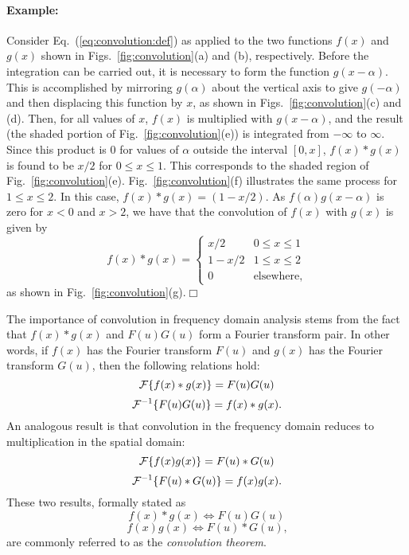 \paragraph{Example:} Consider Eq.~(\ref{eq:convolution:def}) as applied
to the two functions $f(x)$ and $g(x)$ shown in
Figs.~\ref{fig:convolution}(a) and (b), respectively.  Before the
integration can be carried out, it is necessary to form the function
$g(x-\alpha)$.  This is accomplished by mirroring $g(\alpha)$ about
the vertical axis to give $g(-\alpha)$ and then displacing this
function by $x$, as shown in Figs.~\ref{fig:convolution}(c) and (d).
Then, for all values of $x$, $f(x)$ is multiplied with $g(x-\alpha)$,
and the result (the shaded portion of Fig.~\ref{fig:convolution}(e))
is integrated from $-\infty$ to $\infty$.  Since this product is $0$
for values of $\alpha$ outside the interval $[0,x]$, $f(x)\ast g(x)$
is found to be $x/2$ for $0\leq x\leq 1$.  This corresponds to the
shaded region of Fig.~\ref{fig:convolution}(e).
Fig.~\ref{fig:convolution}(f) illustrates the same process for $1\leq
x\leq 2$.  In this case, $f(x)\ast g(x)=(1-x/2)$.  As
$f(\alpha)g(x-\alpha)$ is zero for $x<0$ and $x>2$, we have that the
convolution of $f(x)$ with $g(x)$ is given by
\begin{equation}
  f(x)\ast g(x)=\left\{\begin{array}{ll}
                         x/2   & 0\leq x\leq 1 \\
                         1-x/2 & 1\leq x\leq 2 \\
                         0     & \mbox{elsewhere,}
                       \end{array}\right.
\end{equation}
as shown in Fig.~\ref{fig:convolution}(g).\hfill$\Box$
\vspace*{0.5cm}

The importance of convolution in frequency domain analysis stems from
the fact that $f(x)\ast g(x)$ and $F(u)G(u)$ form a Fourier transform
pair.  In other words, if $f(x)$ has the Fourier transform $F(u)$ and
$g(x)$ has the Fourier transform $G(u)$, then the following relations
hold:
\begin{equation}
  {\cal F}\{f(x)\ast g(x)\}=F(u)G(u)
\end{equation}
\begin{equation}
  {\cal F}^{-1}\{F(u)G(u)\}=f(x)\ast g(x)\mbox{.}
\end{equation}
An analogous result is that convolution in the frequency domain
reduces to multiplication in the spatial domain:
\begin{equation}
  {\cal F}\{f(x)g(x)\}=F(u)\ast G(u)
\end{equation}
\begin{equation}
  {\cal F}^{-1}\{F(u)\ast G(u)\}=f(x)g(x)\mbox{.}
\end{equation}
These two results, formally stated as
\begin{equation}
  f(x)\ast g(x)\Leftrightarrow F(u)G(u)
\end{equation}
\begin{equation}
  f(x)g(x)\Leftrightarrow F(u)\ast G(u)\mbox{,}
\end{equation}
are commonly referred to as the {\em convolution theorem\/}.

